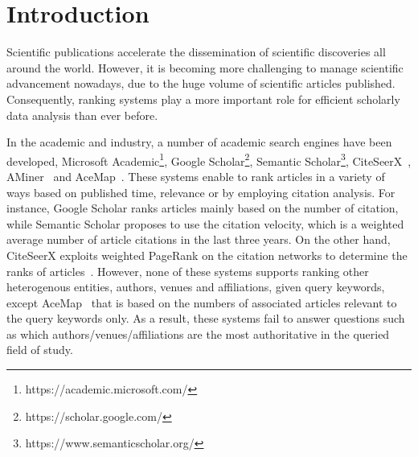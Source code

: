 \section{Introduction}
\label{sec-intro}




Scientific publications accelerate the dissemination of scientific discoveries all around the world. However, it is becoming more challenging to manage scientific advancement nowadays, due to the huge volume of scientific articles published.
Consequently, ranking systems play a more important role for efficient scholarly data analysis than ever before.




In the academic and industry, a number of academic search engines have been developed, \eg Microsoft Academic\footnote{https://academic.microsoft.com/}, Google Scholar\footnote{https://scholar.google.com/}, Semantic Scholar\footnote{https://www.semanticscholar.org/}, CiteSeerX~\cite{li2006citeseerx}, AMiner~\cite{tang2008arnetminer} and AceMap~\cite{tan2016acemap}.
%
These systems enable to rank articles in a variety of  ways based on published time, relevance or by  employing citation analysis. For instance, Google Scholar ranks articles mainly based on the number of citation, while Semantic Scholar proposes to use the citation velocity, which is a weighted average number of article citations in the last three years. On the other hand, CiteSeerX exploits weighted PageRank on the citation networks to determine the ranks of articles~\cite{sun2007popularity}.
%
However, none of these systems supports ranking other heterogenous entities, \eg authors, venues and affiliations, given query keywords, except AceMap~\cite{tan2016acemap} that is based on the numbers of associated articles relevant to the query keywords only. As a result, these systems fail to answer questions such as which authors/venues/affiliations are the most authoritative in the queried field of study.


